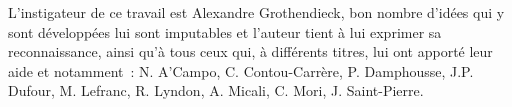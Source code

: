 \documentclass[12pt,twoside]{report} %
\begin{document}
\newpage 
\thispagestyle{empty}

\null\vfill
\noindent\begin{minipage}{\textwidth}
L'instigateur de ce travail est Alexandre Grothendieck, bon nombre d'idées qui y sont développées lui sont imputables et l'auteur tient à lui exprimer sa reconnaissance, ainsi qu'à tous ceux qui, à différents titres, lui ont apporté leur aide et notamment~: N. A'Campo, C. Contou-Carrère, P. Damphousse, J.P. Dufour, M. Lefranc, R. Lyndon, A. Micali, C. Mori, J. Saint-Pierre.
\end{minipage}
\vfill\null

\newpage
\thispagestyle{empty}
\mbox{}


\renewcommand{\contentsname}{TABLE DES MATIÈRES}
\tableofcontents\thispagestyle{empty}

\setcounter{page}{0}











\newpage
\mbox{}
\thispagestyle{empty}
\end{document}
